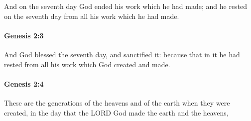 			And on the seventh day God ended his work which he had made; and he rested on the seventh day from all his work which he had made.


		\paragraph{Genesis 2:3} %
			\label{GENESIS-2-3}

			And God blessed the seventh day, and sanctified it: because that in it he had rested from all his work which God created and made.


		\paragraph{Genesis 2:4} %
			\label{GENESIS-2-4}

			These are the generations of the heavens and of the earth when they were created, in the day that the LORD God made the earth and the heavens,


